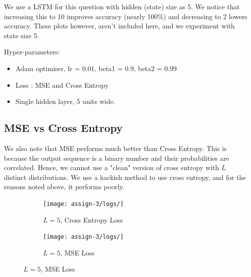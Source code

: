 We use a LSTM for this question with hidden (state) size as 5. We notice that increasing this to 10 improves accuracy (nearly 100\%) and decreasing to 2 lowers accuracy. These plots however, aren't included here, and we experiment with state size 5.

Hyper-parameters:
\begin{itemize}
\item  Adam optimiser, lr = 0.01, beta1 = 0.9, beta2 = 0.99
\item  Loss : MSE and Cross Entropy
\item  Single hidden layer, 5 units wide.
\end{itemize}

\subsection{MSE vs Cross Entropy}
We also note that MSE performs much better than Cross Entropy. This is because the output sequence is a binary number and their probabilities are correlated. Hence, we cannot use a "clean" version of cross entropy with $L$ distinct distributions. We use a hackish method to use cross entropy, and for the reasons noted above, it performs poorly.

\begin{figure}[!htbp]
\begin{subfigure}
\centering
\texttt{[image: assign-3/logs/]}
\caption{$L=5$, Cross Entropy Loss}
\end{subfigure}
\begin{subfigure}
\centering
\texttt{[image: assign-3/logs/]}
\caption{$L=5$, MSE Loss}
\end{subfigure}
\end{figure}



 